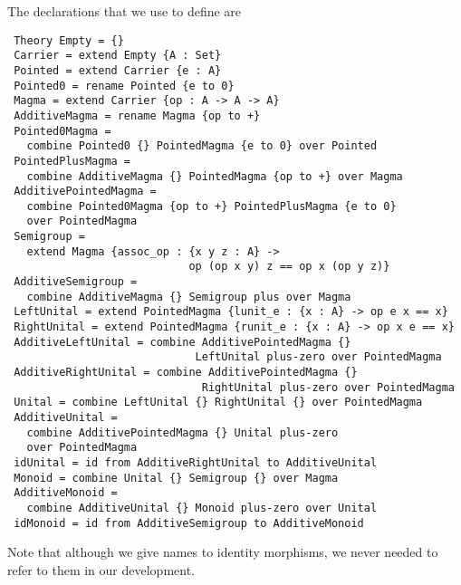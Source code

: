 The declarations that we use to define  are 
\begin{verbatim} 
 Theory Empty = {} 
 Carrier = extend Empty {A : Set}
 Pointed = extend Carrier {e : A}
 Pointed0 = rename Pointed {e to 0} 
 Magma = extend Carrier {op : A -> A -> A}
 AdditiveMagma = rename Magma {op to +} 
 Pointed0Magma = 
   combine Pointed0 {} PointedMagma {e to 0} over Pointed
 PointedPlusMagma = 
   combine AdditiveMagma {} PointedMagma {op to +} over Magma
 AdditivePointedMagma = 
   combine Pointed0Magma {op to +} PointedPlusMagma {e to 0} 
   over PointedMagma
 Semigroup = 
   extend Magma {assoc_op : {x y z : A} -> 
                            op (op x y) z == op x (op y z)}
 AdditiveSemigroup = 
   combine AdditiveMagma {} Semigroup plus over Magma
 LeftUnital = extend PointedMagma {lunit_e : {x : A} -> op e x == x}
 RightUnital = extend PointedMagma {runit_e : {x : A} -> op x e == x}
 AdditiveLeftUnital = combine AdditivePointedMagma {} 
                             LeftUnital plus-zero over PointedMagma 
 AdditiveRightUnital = combine AdditivePointedMagma {} 
                              RightUnital plus-zero over PointedMagma 
 Unital = combine LeftUnital {} RightUnital {} over PointedMagma
 AdditiveUnital = 
   combine AdditivePointedMagma {} Unital plus-zero 
   over PointedMagma
 idUnital = id from AdditiveRightUnital to AdditiveUnital 
 Monoid = combine Unital {} Semigroup {} over Magma
 AdditiveMonoid = 
   combine AdditiveUnital {} Monoid plus-zero over Unital 
 idMonoid = id from AdditiveSemigroup to AdditiveMonoid   
\end{verbatim} 
\noindent Note that although we give names to identity morphisms, we never needed to refer to them in our development. 

